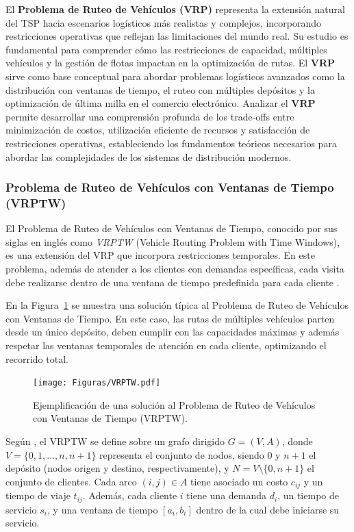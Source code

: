 \documentclass[12pt,titlepage,twoside,openright]{book}
\begin{document}
El \textbf{Problema de Ruteo de Vehículos (VRP)} representa la extensión natural del TSP hacia escenarios logísticos más realistas y complejos, incorporando restricciones operativas que reflejan las limitaciones del mundo real. Su estudio es fundamental para comprender cómo las restricciones de capacidad, múltiples vehículos y la gestión de flotas impactan en la optimización de rutas. El \textbf{VRP} sirve como base conceptual para abordar problemas logísticos avanzados como la distribución con ventanas de tiempo, el ruteo con múltiples depósitos y la optimización de última milla en el comercio electrónico. Analizar el \textbf{VRP} permite desarrollar una comprensión profunda de los trade-offs entre minimización de costos, utilización eficiente de recursos y satisfacción de restricciones operativas, estableciendo los fundamentos teóricos necesarios para abordar las complejidades de los sistemas de distribución modernos.

\subsubsection{Problema de Ruteo de Vehículos con Ventanas de Tiempo (VRPTW)}
\label{subsec:problem_vrptw}

El Problema de Ruteo de Vehículos con Ventanas de Tiempo, conocido por sus siglas en inglés como \textit{VRPTW} (Vehicle Routing Problem with Time Windows), es una extensión del VRP que incorpora restricciones temporales. En este problema, además de atender a los clientes con demandas específicas, cada visita debe realizarse dentro de una ventana de tiempo predefinida para cada cliente \citep{toth2014}.

En la Figura~\ref{fig:vrptw} se muestra una solución típica al Problema de Ruteo de Vehículos con Ventanas de Tiempo. En este caso, las rutas de múltiples vehículos parten desde un único depósito, deben cumplir con las capacidades máximas y además respetar las ventanas temporales de atención en cada cliente, optimizando el recorrido total.

\begin{figure}[H]
	\centering
	\texttt{[image: Figuras/VRPTW.pdf]}
	\caption{Ejemplificación de una solución al Problema de Ruteo de Vehículos con Ventanas de Tiempo (VRPTW).}
	\label{fig:vrptw}
\end{figure}

Según \citep{toth2014}, el VRPTW se define sobre un grafo dirigido \(G = (V, A)\), donde \(V = \{0, 1, \dots, n, n+1\}\) representa el conjunto de nodos, siendo \(0\) y \(n+1\) el depósito (nodos origen y destino, respectivamente), y \(N = V \setminus \{0, n+1\}\) el conjunto de clientes. Cada arco \((i, j) \in A\) tiene asociado un costo \(c_{ij}\) y un tiempo de viaje \(t_{ij}\). Además, cada cliente \(i\) tiene una demanda \(d_i\), un tiempo de servicio \(s_i\), y una ventana de tiempo \([a_i, b_i]\) dentro de la cual debe iniciarse su servicio.
\end{document}
